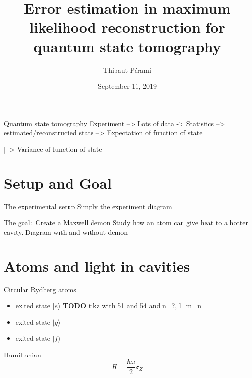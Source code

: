 \documentclass{beamer}
\title{Error estimation in maximum likelihood reconstruction for
    quantum state tomography}
\author{Thibaut Pérami}
\institute{LKB, Collège de France}
\date{September 11, 2019}
\newcommand{\TODO}{\textbf{TODO}}
\newcommand{\ket}[1]{|#1\rangle}
\begin{document}
\maketitle

\begin{frame}{Quantum state tomography}
  Experiment --> Lots of data -> Statistics --> estimated/reconstructed state
  --> Expectation of function of state

  |--> Variance of function of state
\end{frame}

\section{Setup and Goal}


\begin{frame}{The experimental setup}
  Simply the experiment diagram
\end{frame}

\begin{frame}{The goal$\colon{}$ Create a Maxwell demon}
  Study how an atom can give heat to a hotter cavity.
  Diagram with and without demon
\end{frame}

\section{Atoms and light in cavities}

\begin{frame}{Circular Rydberg atoms}

  \begin{itemize}
  \item exited state $\ket e$ \TODO{} tikz with 51 and 54 and n=?, l=m=n
  \item exited state $\ket g$
  \item exited state $\ket f$
  \end{itemize}

  \begin{block}{Hamiltonian}
    \[H = \frac{\hbar \omega}2 \sigma_Z\]
  \end{block}

\end{frame}
\end{document}
